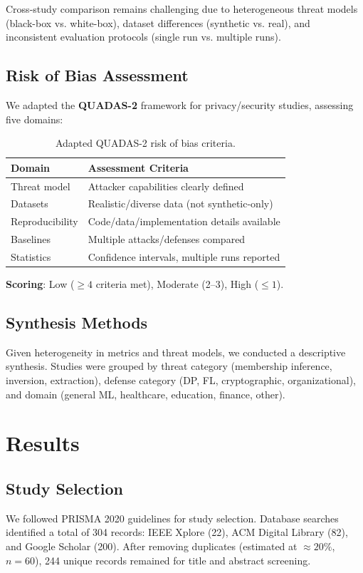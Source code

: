 \documentclass[conference]{IEEEtran}
\begin{document}
Cross-study comparison remains challenging due to heterogeneous threat models (black-box vs. white-box), dataset differences (synthetic vs. real), and inconsistent evaluation protocols (single run vs. multiple runs).

\subsection{Risk of Bias Assessment}
We adapted the \textbf{QUADAS-2} framework for privacy/security studies, assessing five domains:
\begin{table}[!t]
\centering
\small
\renewcommand{\arraystretch}{1.05}
\begin{tabular}{L{0.30\columnwidth} L{0.65\columnwidth}}
\toprule
\textbf{Domain} & \textbf{Assessment Criteria} \\
\midrule
Threat model & Attacker capabilities clearly defined \\
Datasets & Realistic/diverse data (not synthetic-only) \\
Reproducibility & Code/data/implementation details available \\
Baselines & Multiple attacks/defenses compared \\
Statistics & Confidence intervals, multiple runs reported \\
\bottomrule
\end{tabular}
\caption{Adapted QUADAS-2 risk of bias criteria.}
\label{tab:quadas2}
\end{table}

\textbf{Scoring}: Low ($\geq 4$ criteria met), Moderate (2--3), High ($\leq 1$).

\subsection{Synthesis Methods}
Given heterogeneity in metrics and threat models, we conducted a descriptive synthesis. Studies were grouped by threat category (membership inference, inversion, extraction), defense category (DP, FL, cryptographic, organizational), and domain (general ML, healthcare, education, finance, other).

\section{Results}
\label{sec:Results}

\subsection{Study Selection}
We followed PRISMA 2020 guidelines for study selection. Database searches identified a total of 304 records: IEEE Xplore (22), ACM Digital Library (82), and Google Scholar (200). After removing duplicates (estimated at $\approx 20\%$, $n=60$), 244 unique records remained for title and abstract screening.
\end{document}
